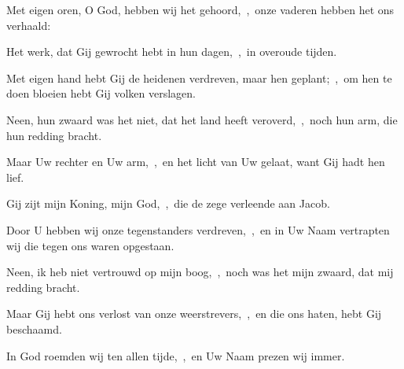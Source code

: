 \documentclass[12pt,twoside,a5paper]{article}
\begin{document}




\begin{halfparskip}
  Met eigen oren, O God, hebben wij het gehoord,~\sep\ onze vaderen hebben het ons verhaald:


  Het werk, dat Gij gewrocht hebt in hun dagen,~\sep\ in overoude tijden.

  Met eigen hand hebt Gij de heidenen verdreven, maar hen geplant;~\sep\ om hen te doen bloeien hebt Gij volken verslagen.

  Neen, hun zwaard was het niet, dat het land heeft veroverd,~\sep\ noch hun arm, die hun redding bracht.

  Maar Uw rechter en Uw arm,~\sep\ en het licht van Uw gelaat, want Gij hadt hen lief.

  Gij zijt mijn Koning, mijn God,~\sep\ die de zege verleende aan Jacob.

  Door U hebben wij onze tegenstanders verdreven,~\sep\ en in Uw Naam vertrapten wij die tegen ons waren opgestaan.

  Neen, ik heb niet vertrouwd op mijn boog,~\sep\ noch was het mijn zwaard, dat mij redding bracht.

  Maar Gij hebt ons verlost van onze weerstrevers,~\sep\ en die ons haten, hebt Gij beschaamd.

  In God roemden wij ten allen tijde,~\sep\ en Uw Naam prezen wij immer.
\end{halfparskip}

\end{document}
